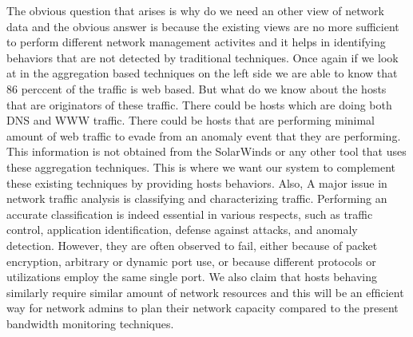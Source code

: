 The obvious question that arises is why do we need an other view of network data and the obvious answer is because the existing views are no more sufficient to perform different network management activites and it helps in identifying behaviors that are not detected by traditional techniques. Once again if we look at  in the aggregation based techniques on the left side we are able to know that 86 perccent of the traffic is web based. But what do we know about the hosts that are originators of these traffic. There could be hosts which are doing both DNS and WWW traffic. There could be hosts that are performing minimal amount of web traffic to evade from an anomaly event that they are performing. This information is not obtained from the SolarWinds or any other tool that uses these aggregation techniques. This is where we want our system to complement these existing techniques by providing hosts behaviors. Also, A major issue in network traffic analysis is classifying and characterizing traffic. Performing an accurate classification is indeed essential in various respects, such as traffic control, application identification, defense against attacks, and anomaly detection.
However, they are often observed to fail, either because of packet encryption, arbitrary or dynamic port use, or because different protocols or utilizations employ the same single port.
We also claim that hosts behaving similarly require similar amount of network resources and this will be an efﬁcient way for network admins to plan their network capacity compared to the present bandwidth monitoring techniques.

 




